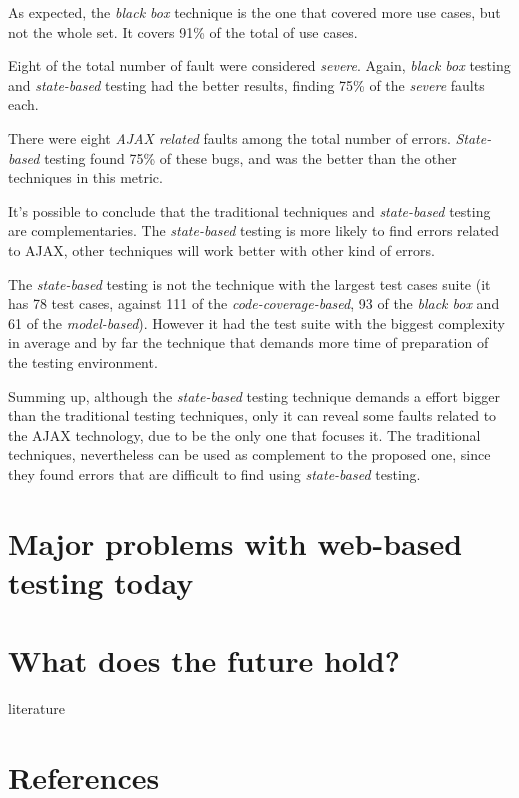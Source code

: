 \documentclass[a4paper]{article}
\begin{document}
As expected, the \emph{black box} technique is the one that covered more use cases, but not the whole set.
It covers 91\% of the total of use cases.

Eight of the total number of fault were considered \emph{severe}. Again, \emph{black box} testing and \emph{state-based} testing had the better results, finding 75\% of the \emph{severe} faults each.

There were eight \emph{AJAX related} faults among the total number of errors. 
\emph{State-based} testing found 75\% of these bugs, and was the better than the other techniques in this metric.

It's possible to conclude that the traditional techniques and \emph{state-based} testing are complementaries.
The \emph{state-based} testing is more likely to find errors related to AJAX, other techniques will work better with other kind of errors.

The \emph{state-based} testing is not the technique with the largest test cases suite (it has 78 test cases, against 111 of the \emph{code-coverage-based}, 93 of the \emph{black box} and 61 of the \emph{model-based}).
However it had the test suite with the biggest complexity in average and by far the technique that demands more time of preparation of the testing environment.

Summing up, although the \emph{state-based} testing technique demands a effort bigger than the traditional testing techniques, only it can reveal some faults related to the AJAX technology, due to be the only one that focuses it.
The traditional techniques, nevertheless can be used as complement to the proposed one, since they found errors that are difficult to find using \emph{state-based} testing.

\section{Major problems with web-based testing today}

\section{What does the future hold?}

\newpage
\appendix

\begin{btSect}[alpha]{literature}
\section{References}
\btPrintAll
\end{btSect}
\end{document}
